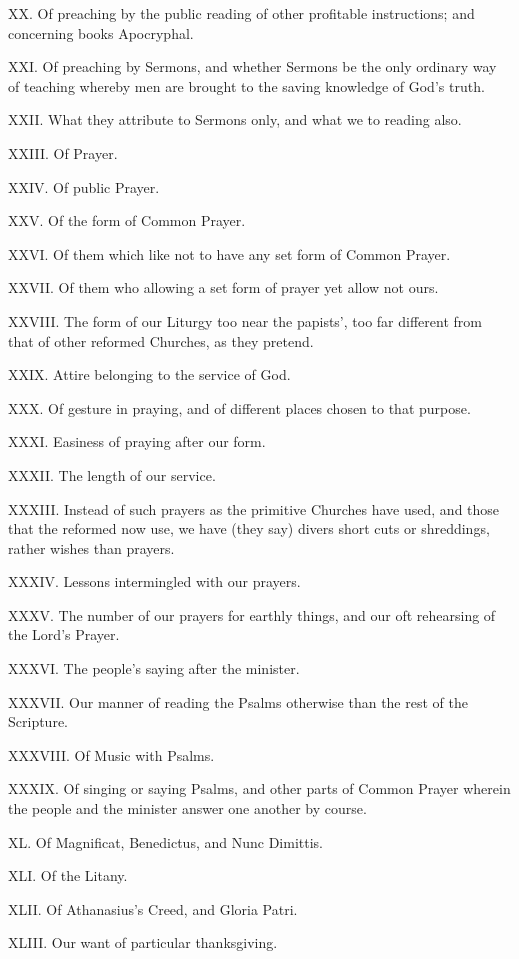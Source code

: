 XX. Of preaching by the public reading of other profitable instructions; and concerning books Apocryphal.

XXI. Of preaching by Sermons, and whether Sermons be the only ordinary way of teaching whereby men are brought to the saving knowledge of God’s truth.

XXII. What they attribute to Sermons only, and what we to reading also.

XXIII. Of Prayer.

XXIV. Of public Prayer.

XXV. Of the form of Common Prayer.

XXVI. Of them which like not to have any set form of Common Prayer.

XXVII. Of them who allowing a set form of prayer yet allow not ours.

XXVIII. The form of our Liturgy too near the papists’, too far different from that of other reformed Churches, as they pretend.

XXIX. Attire belonging to the service of God.

XXX. Of gesture in praying, and of different places chosen to that purpose.

XXXI. Easiness of praying after our form.

XXXII. The length of our service.

XXXIII. Instead of such prayers as the primitive Churches have used, and those that the reformed now use, we have (they say) divers short cuts or shreddings, rather wishes than prayers.

XXXIV. Lessons intermingled with our prayers.

XXXV. The number of our prayers for earthly things, and our oft rehearsing of the Lord’s Prayer.

XXXVI. The people’s saying after the minister.

XXXVII. Our manner of reading the Psalms otherwise than the rest of the Scripture.

XXXVIII. Of Music with Psalms.

XXXIX. Of singing or saying Psalms, and other parts of Common Prayer wherein the people and the minister answer one another by course.

XL. Of Magnificat, Benedictus, and Nunc Dimittis.

XLI. Of the Litany.

XLII. Of Athanasius’s Creed, and Gloria Patri.

XLIII. Our want of particular thanksgiving.

